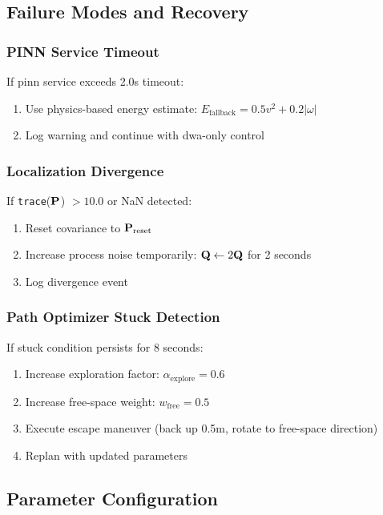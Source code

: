 \subsection{Failure Modes and Recovery}

\subsubsection{PINN Service Timeout}

If \acrshort{pinn} service exceeds 2.0s timeout:
\begin{enumerate}
    \item Use physics-based energy estimate: $E_{\text{fallback}} = 0.5v^2 + 0.2|\omega|$
    \item Log warning and continue with \acrshort{dwa}-only control
\end{enumerate}

\subsubsection{Localization Divergence}

If \texttt{trace}($\mathbf{P}$) $> 10.0$ or NaN detected:
\begin{enumerate}
    \item Reset covariance to $\mathbf{P}_{\text{reset}}$
    \item Increase process noise temporarily: $\mathbf{Q} \leftarrow 2\mathbf{Q}$ for 2 seconds
    \item Log divergence event
\end{enumerate}

\subsubsection{Path Optimizer Stuck Detection}

If stuck condition persists for 8 seconds:
\begin{enumerate}
    \item Increase exploration factor: $\alpha_{\text{explore}} = 0.6$
    \item Increase free-space weight: $w_{\text{free}} = 0.5$
    \item Execute escape maneuver (back up 0.5m, rotate to free-space direction)
    \item Replan with updated parameters
\end{enumerate}

\subsection{Parameter Configuration}

